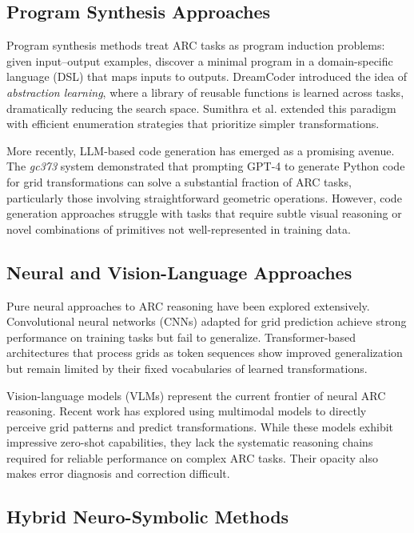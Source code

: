 \documentclass[conference,10pt,letterpaper]{IEEEtran}
\begin{document}
\subsection{Program Synthesis Approaches}

Program synthesis methods treat ARC tasks as program induction problems: given input--output examples, discover a minimal program in a domain-specific language (DSL) that maps inputs to outputs. DreamCoder \cite{ellis2021dreamcoder} introduced the idea of \emph{abstraction learning}, where a library of reusable functions is learned across tasks, dramatically reducing the search space. Sumithra et al. \cite{sumithra2024efficient} extended this paradigm with efficient enumeration strategies that prioritize simpler transformations.

More recently, LLM-based code generation has emerged as a promising avenue. The \emph{gc373} system \cite{gc3732024} demonstrated that prompting GPT-4 to generate Python code for grid transformations can solve a substantial fraction of ARC tasks, particularly those involving straightforward geometric operations. However, code generation approaches struggle with tasks that require subtle visual reasoning or novel combinations of primitives not well-represented in training data.

\subsection{Neural and Vision-Language Approaches}

Pure neural approaches to ARC reasoning have been explored extensively. Convolutional neural networks (CNNs) adapted for grid prediction \cite{clark2023learning} achieve strong performance on training tasks but fail to generalize. Transformer-based architectures \cite{chen2021neural} that process grids as token sequences show improved generalization but remain limited by their fixed vocabularies of learned transformations.

Vision-language models (VLMs) represent the current frontier of neural ARC reasoning. Recent work \cite{zhang2024visual} has explored using multimodal models to directly perceive grid patterns and predict transformations. While these models exhibit impressive zero-shot capabilities, they lack the systematic reasoning chains required for reliable performance on complex ARC tasks. Their opacity also makes error diagnosis and correction difficult.

\subsection{Hybrid Neuro-Symbolic Methods}
\end{document}
